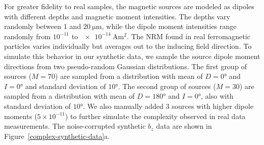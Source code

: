 For greater fidelity to real samples, the magnetic sources are modeled as dipoles with different depths and magnetic moment intensities.
The depths vary randomly between 1 and $\qty{20}{\um}$, while the dipole moment intensities range randomly from $10^{-11}$ to $\qty{e-14}{\ampere\m\squared}$.
The NRM found in real ferromagnetic particles varies individually but averages out to the inducing field direction.
To simulate this behavior in our synthetic data, we sample the source dipole moment directions from two pseudo-random Gaussian distributions.
The first group of sources ($M = 70$) are sampled from a distribution  with mean of $D = \ang{0}$ and $I = \ang{0}$ and standard deviation of $\ang{10}$.
The second group of sources ($M = 30$) are sampled from a distribution with mean of $D = \ang{180}$ and $I = \ang{0}$, also with standard deviation of $\ang{10}$. We also manually added 3 sources with higher dipole moments ($5 \times 10^{-11}$) to further simulate the complexity observed in real data measurements. The noise-corrupted synthetic $b_z$ data are shown in Figure~\ref{complex-synthetic-data}a.

